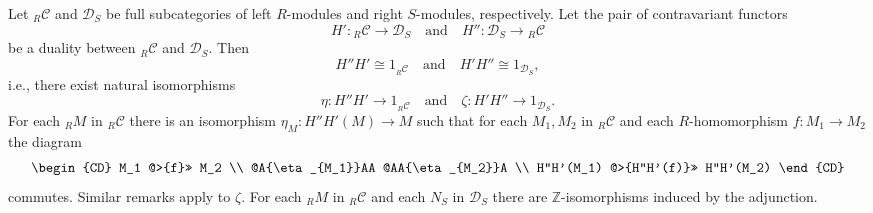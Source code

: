 Let ${}_R \mathcal{C}$ and $\mathcal{D}_S$ be full subcategories of left $R$-modules and right $S$-modules, respectively. Let the pair of contravariant functors
$$H': {}_R \mathcal{C} \to \mathcal{D}_S \quad \text{and} \quad H'': \mathcal{D}_S \to {}_R \mathcal{C}$$
be a duality between ${}_R \mathcal{C}$ and $\mathcal{D}_S$. Then
$$H''H' \cong 1_{{}_R \mathcal{C}} \quad \text{and} \quad H'H'' \cong 1_{\mathcal{D}_S},$$
i.e., there exist natural isomorphisms
$$\eta: H''H' \to 1_{{}_R \mathcal{C}} \quad \text{and} \quad \zeta: H'H'' \to 1_{\mathcal{D}_S}.$$
For each ${}_R M$ in ${}_R \mathcal{C}$ there is an isomorphism $\eta_M: H''H'(M) \to M$ such that for each $M_1, M_2$ in ${}_R \mathcal{C}$ and each $R$-homomorphism $f: M_1 \to M_2$ the diagram
$$\begin{CD}
M_1 @>{f}>> M_2 \\
@A{\eta_{M_1}}AA @AA{\eta_{M_2}}A \\
H''H'(M_1) @>{H''H'(f)}>> H''H'(M_2)
\end{CD}$$
commutes. Similar remarks apply to $\zeta$. For each ${}_R M$ in ${}_R \mathcal{C}$ and each $N_S$ in $\mathcal{D}_S$ there are $\mathbb{Z}$-isomorphisms induced by the adjunction.
